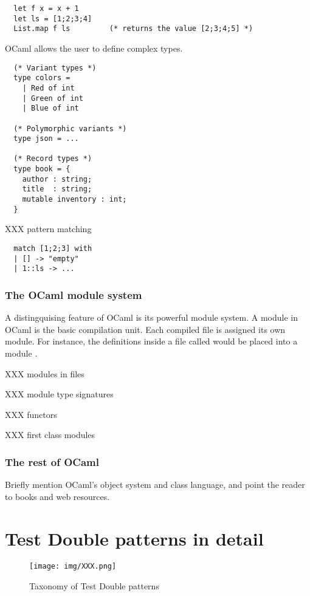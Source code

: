 \begin{lstlisting}
  let f x = x + 1
  let ls = [1;2;3;4]
  List.map f ls         (* returns the value [2;3;4;5] *)
\end{lstlisting}

OCaml allows the user to define complex types.

\begin{lstlisting}
  (* Variant types *)
  type colors =
    | Red of int
    | Green of int
    | Blue of int

  (* Polymorphic variants *)
  type json = ...

  (* Record types *)
  type book = {
    author : string;
    title  : string;
    mutable inventory : int;
  }
\end{lstlisting}

XXX pattern matching

\begin{lstlisting}
  match [1;2;3] with
  | [] -> "empty"
  | 1::ls -> ...
\end{lstlisting}

\subsubsection{The OCaml module system}

A distingquising feature of OCaml is its powerful module system. A
module in OCaml is the basic compilation unit. Each compiled file is
assigned its own module. For instance, the definitions inside a file
called  would be placed into a module .

XXX modules in files

XXX module type signatures

XXX functors

XXX first class modules

\subsubsection{The rest of OCaml}

Briefly mention OCaml's object system and class language, and point
the reader to books and web resources.

\section{Test Double patterns in detail}
\label{testdoubles}

\begin{figure}
  \centering
  \texttt{[image: img/XXX.png]}
  \caption[Taxonomy of Test Double patterns]{Taxonomy of Test Double patterns\footnotemark}
  \label{fig:taxonomy}
\end{figure}

